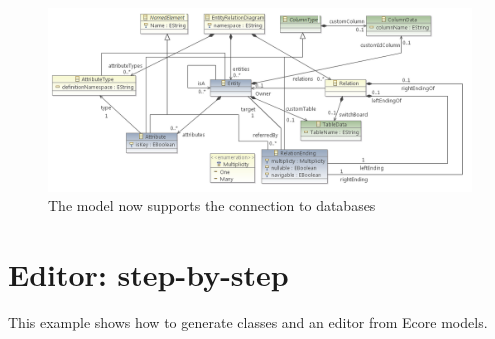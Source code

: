 \documentclass[]{report}
\let\Oldincludegraphics\includegraphics
\renewcommand{\includegraphics}[1]{
\begin{adjustbox}{max size={\textwidth}{\textheight}}
    \Oldincludegraphics[scale=0.6]{#1}%
\end{adjustbox}
}
\begin{document}
\begin{enumerate}
  \begin{figure}[htbp]
  \centering
  \includegraphics{img/emf/ERDiagram04.png}
  \caption{The model now supports the connection to databases}
  \end{figure}
\end{enumerate}

\section{Editor: step-by-step}

This example shows how to generate classes and an editor from Ecore
models.
\end{document}
